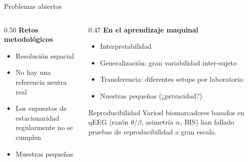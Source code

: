 
\begin{frame}{Problemas abiertos}
  \begin{columns}[T]
    \begin{column}{0.50\textwidth}
      \textbf{Retos metodológicos}
      \begin{itemize}
        \item Resolución espacial
        \item No hay una referencia neutra real
        \item Los supuestos de estacionaridad regularmente no se cumplen
        \item Muestras pequeñas
      \end{itemize}
    \end{column}
    \begin{column}{0.47\textwidth}
      \textbf{En el aprendizaje maquinal}
      \begin{itemize}
        \item Interpretabilidad
        \item Generalización: gran variabilidad inter-sujeto
        \item Transferencia: diferentes setups por laboratorio
        \item Nuestras pequeñas (¿privacidad?)
      \end{itemize}
      \vspace{0.3em}
      \begin{block}{Reproducibilidad}
        \small Variosl biomarcadores basados en qEEG (razón $\theta/\beta$, asimetría $\alpha$, BIS) han fallado pruebas de reproducibilidad a gran escala.
      \end{block}
    \end{column}
  \end{columns}
\end{frame}
